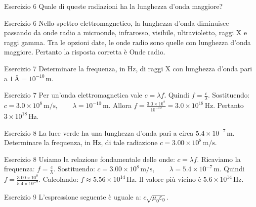 \documentclass[a4paper]{article}
\begin{document}
\begin{snippetexercise}{Esercizio 6}
    Quale di queste radiazioni ha la lunghezza d'onda maggiore?

\end{snippetexercise}
\begin{snippetsolution}{Esercizio 6}
    Nello spettro elettromagnetico, la lunghezza d'onda diminuisce passando da
    onde radio a microonde, infrarosso, visibile, ultravioletto, raggi X e raggi
    gamma.
    Tra le opzioni date, le onde radio sono quelle con lunghezza d'onda
    maggiore.
    Pertanto la risposta corretta è
    \(\boxed{\text{Onde radio}}.\)
\end{snippetsolution}
\begin{snippetexercise}{Esercizio 7}
    Determinare la frequenza, in \(\mathrm{Hz}\), di raggi X con lunghezza
    d'onda pari a
    \(1\,\text{\AA} = 10^{-10}\,\mathrm{m}.\)

\end{snippetexercise}
\begin{snippetsolution}{Esercizio 7}
    Per un'onda elettromagnetica vale
    \(c = \lambda f.\)
    Quindi
    \(f = \frac{c}{\lambda}.\)
    Sostituendo:
    \(c = 3.0 \times 10^8\,\mathrm{m/s}, \qquad \lambda = 10^{-10}\,\mathrm{m}.\)
    Allora
    \(f = \frac{3.0 \times 10^8}{10^{-10}} = 3.0 \times 10^{18}\,\mathrm{Hz}.\)
    Pertanto
    \(\boxed{3 \times 10^{18}\,\mathrm{Hz}}.\)
\end{snippetsolution}
\begin{snippetexercise}{Esercizio 8}
    La luce verde ha una lunghezza d'onda pari a circa
    \(5.4 \times 10^{-7}\,\mathrm{m}\). Determinare la frequenza, in
    \(\mathrm{Hz}\), di tale radiazione
    \(c = 3.00 \times 10^8\,\mathrm{m/s}.\)

\end{snippetexercise}
\begin{snippetsolution}{Esercizio 8}
    Usiamo la relazione fondamentale delle onde:
    \(c = \lambda f.\)
    Ricaviamo la frequenza:
    \(f = \frac{c}{\lambda}.\)
    Sostituendo:
    \(c = 3.00 \times 10^8\,\mathrm{m/s}, \qquad \lambda = 5.4 \times 10^{-7}\,\mathrm{m}.\)
    Quindi
    \(f = \frac{3.00 \times 10^8}{5.4 \times 10^{-7}}.\)
    Calcolando:
    \(f \approx 5.56 \times 10^{14}\,\mathrm{Hz}.\)
    Il valore più vicino è
    \(\boxed{5.6 \times 10^{14}\,\mathrm{Hz}}.\)
\end{snippetsolution}
\begin{snippetexercise}{Esercizio 9}
    L'espressione seguente è uguale a:
    \(c\sqrt{\mu_0\varepsilon_0}.\)

\end{snippetexercise}
\end{document}
